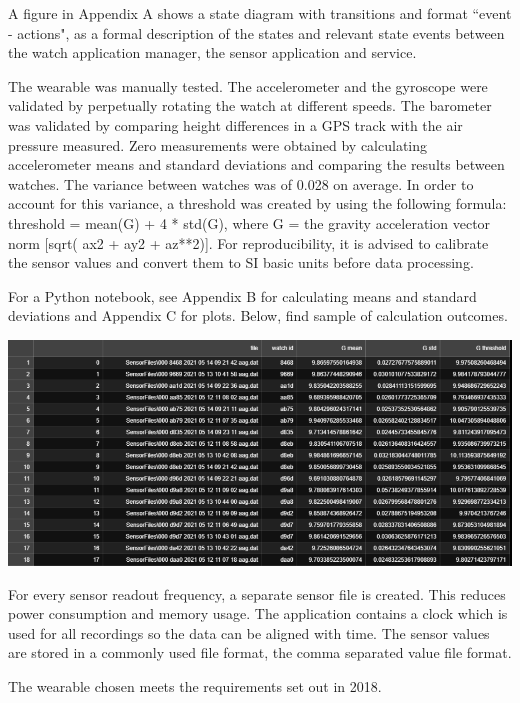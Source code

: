 \documentclass[12pt, a4paper]{article}
\begin{document}
A figure in Appendix A shows a state diagram with transitions and format ``event - actions", as a formal description of the states and relevant state events between the watch application manager, the sensor application and service.



The wearable was manually tested. The accelerometer and the gyroscope were validated by perpetually rotating the watch at different speeds. The barometer was validated by comparing height differences in a GPS track with the air pressure measured. Zero measurements were obtained by calculating accelerometer means and standard deviations and comparing the results between watches. The variance between watches was of 0.028 on average. In order to account for this variance, a threshold was created by using the following formula: threshold = mean(G) + 4 * std(G), where G = the gravity acceleration vector norm [sqrt( ax2 + ay2 + az**2)]. For reproducibility, it is advised to calibrate the sensor values and convert them to SI basic units before data processing. 


For a Python notebook, see Appendix B for calculating means and standard deviations and Appendix C for plots. Below, find sample of calculation outcomes. 



\begin{center}
    \includegraphics[width=.999\textwidth]{Pic 44.png}
\end{center}


For every sensor readout frequency, a separate sensor file is created. This reduces power
consumption and memory usage. The application contains a clock which
is used for all recordings so the data can be aligned with time. The
sensor values are stored in a commonly used file format, the comma
separated value file format.

The wearable chosen meets the requirements set out in 2018. 
\end{document}
